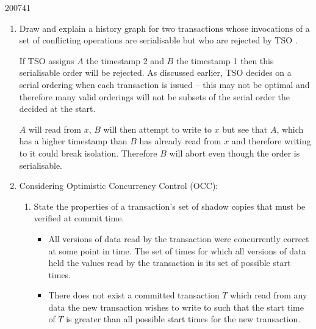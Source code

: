 \documentclass[10pt,\jkfside,a4paper]{article}
\begin{document}
\begin{examquestion}{2007}{4}{1}
\begin{enumerate}[label=(\alph*)]
\item Draw and explain a history graph for two transactions whose invocations
of a set of conflicting operations are serialisable but who are rejected by
TSO .

If TSO assigns $A$ the timestamp 2 and $B$ the timestamp 1 then this
serialisable order will be rejected. As discussed earlier, TSO decides on a
serial ordering when each transaction is issued -- this may not be optimal
and therefore many valid orderings will not be subsets of the serial order
the decided at the start.

$A$ will read from $x$, $B$ will then attempt to write to $x$ but see that
$A$, which has a higher timestamp than $B$ has already read from $x$ and
therefore writing to it could break isolation. Therefore $B$ will abort even
though the order is serialisable.

\begin{center}
\end{center}

\item Considering Optimistic Concurrency Control (OCC):

\begin{enumerate}[label=(\roman*)]

\item State the properties of a transaction's set of shadow copies that must
be verified at commit time.

\begin{itemize}

\item All versions of data read by the transaction were concurrently correct
at some point in time. The set of times for which all versions of data held
the values read by the transaction is its set of possible start times.

\item There does not exist a committed transaction $T$ which read from any
data the new transaction wishes to write to such that the start time of $T$
is greater than all possible start times for the new transaction.


\end{itemize}
\end{enumerate}
\end{enumerate}
\end{examquestion}
\end{document}
